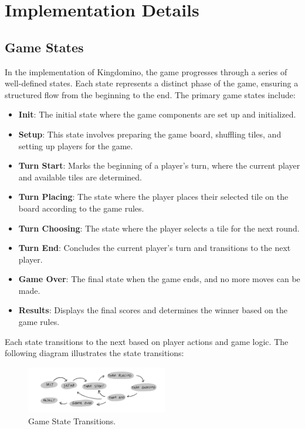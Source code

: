 \documentclass[conference]{IEEEtran}
\begin{document}
\section{Implementation Details}

\subsection{Game States}

In the implementation of Kingdomino, the game progresses through a series of well-defined states. Each state represents a distinct phase of the game, ensuring a structured flow from the beginning to the end. The primary game states include:

\begin{itemize}
    \item \textbf{Init}: The initial state where the game components are set up and initialized.
    \item \textbf{Setup}: This state involves preparing the game board, shuffling tiles, and setting up players for the game.
    \item \textbf{Turn Start}: Marks the beginning of a player's turn, where the current player and available tiles are determined.
    \item \textbf{Turn Placing}: The state where the player places their selected tile on the board according to the game rules.
    \item \textbf{Turn Choosing}: The state where the player selects a tile for the next round.
    \item \textbf{Turn End}: Concludes the current player's turn and transitions to the next player.
    \item \textbf{Game Over}: The final state when the game ends, and no more moves can be made.
    \item \textbf{Results}: Displays the final scores and determines the winner based on the game rules.
\end{itemize}

Each state transitions to the next based on player actions and game logic. The
following diagram illustrates the state transitions:

\begin{figure}[htbp]
    \centerline{\includegraphics[width=0.55\textwidth]{assets/states.png}}
    \caption{Game State Transitions.}\label{fig:game_states}
\end{figure}
\end{document}

